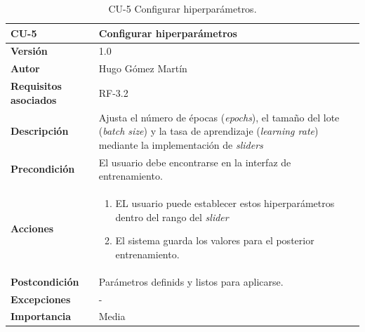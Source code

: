 \begin{table}[p]
	\centering
	\begin{tabularx}{\linewidth}{ p{} p{} }
		\toprule
		\textbf{CU-5}    & \textbf{Configurar hiperparámetros}\\
		\toprule
		\textbf{Versión}              & 1.0    \\
		\textbf{Autor}                & Hugo Gómez Martín \\
		\textbf{Requisitos asociados} & RF-3.2 \\
		\textbf{Descripción}          & Ajusta el número de épocas (\textit{epochs}), el tamaño del lote (\textit{batch size}) y la tasa de aprendizaje (\textit{learning rate}) mediante la implementación de \textit{sliders} \\
		\textbf{Precondición}         & El usuario debe encontrarse en la interfaz de entrenamiento. \\
		\textbf{Acciones}             &
		\begin{enumerate}
			\def\labelenumi{\arabic{enumi}.}
			\tightlist
			\item EL usuario puede establecer estos hiperparámetros dentro del rango del \textit{slider}
			\item El sistema guarda los valores para el posterior entrenamiento.
		\end{enumerate}\\
		\textbf{Postcondición}        & Parámetros definids y listos para aplicarse. \\
		\textbf{Excepciones}          & - \\
		\textbf{Importancia}          & Media \\
		\bottomrule
	\end{tabularx}
	\caption{CU-5 Configurar hiperparámetros.}
\end{table}


